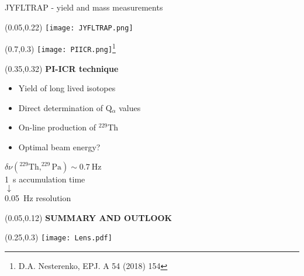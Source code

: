 \documentclass[10pt,aspectratio=169]{beamer}
\begin{document}
\begin{frame}{\qquad JYFLTRAP - yield and mass measurements}
	\begin{textblock*}{0.3\paperwidth}(0.05\paperwidth,0.22\paperheight)
		\texttt{[image: JYFLTRAP.png]}
	\end{textblock*}
	\begin{textblock*}{0.25\paperwidth}(0.7\paperwidth,0.3\paperheight)
		\texttt{[image: PIICR.png]}\footnote{D.A. Nesterenko, EPJ. A 54 (2018) 154}
	\end{textblock*}
	\begin{textblock*}{0.3\paperwidth}(0.35\paperwidth,0.32\paperheight)
		\centering
		\textbf{PI-ICR technique}
		\begin{itemize}
			\item Yield of long lived isotopes
			\item Direct determination of Q$_{\alpha}$ values
			\item On-line production of $^{229}$Th
			\item Optimal beam energy?
		\end{itemize}
		\vspace{0.05\textheight}
		$\delta \nu (^{229}\text{Th},^{229}\text{Pa})\sim 0.7\ \text{Hz}$\\
		\vspace{0.0\textheight}
		1~s accumulation time\\ $\downarrow$\\ 0.05~Hz resolution		
	\end{textblock*}
\end{frame}

\begin{SectionTitle}
	\begin{frame}
		\centering
		\begin{textblock*}{0.9\paperwidth}(0.05\paperwidth,0.12\paperheight)
			\centering
			\textbf{\LARGE SUMMARY AND OUTLOOK}	
		\end{textblock*}
		\begin{textblock*}{0.5\paperwidth}(0.25\paperwidth,0.3\paperheight)
			\texttt{[image: Lens.pdf]}
		\end{textblock*}
	\end{frame}
\end{SectionTitle}
\end{document}
